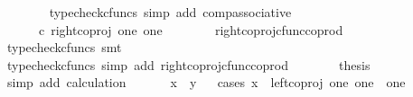 \begin{isabellebody}
\ \ \ \ \ \ \isamarkupfalse%
\ {\isacharparenleft}{\kern0pt}typecheck{\isacharunderscore}{\kern0pt}cfuncs{\isacharcomma}{\kern0pt}\ simp\ add{\isacharcolon}{\kern0pt}\ comp{\isacharunderscore}{\kern0pt}associative{}{\isacharparenright}{\kern0pt}\isanewline
\ \ \ \ \isamarkupfalse%
\ \isamarkupfalse%
\ {\isachardoublequoteopen}{\isachardot}{\kern0pt}{\isachardot}{\kern0pt}{\isachardot}{\kern0pt}\ {\isacharequal}{\kern0pt}\ {\isasymlangle}{\isasymt}{\isacharcomma}{\kern0pt}{\isasymf}{\isasymrangle}\ {\isasymamalg}\ {\isasymlangle}{\isasymf}{\isacharcomma}{\kern0pt}{\isasymt}{\isasymrangle}\ {\isasymcirc}\isactrlsub c\ right{\isacharunderscore}{\kern0pt}coproj\ one\ one{\isachardoublequoteclose}\isanewline
\ \ \ \ \ \ \isamarkupfalse%
\ right{\isacharunderscore}{\kern0pt}coproj{\isacharunderscore}{\kern0pt}cfunc{\isacharunderscore}{\kern0pt}coprod\ \isamarkupfalse%
\ {\isacharparenleft}{\kern0pt}typecheck{\isacharunderscore}{\kern0pt}cfuncs{\isacharcomma}{\kern0pt}\ smt{\isacharparenright}{\kern0pt}\isanewline
\ \ \ \ \isamarkupfalse%
\ \isamarkupfalse%
\ {\isachardoublequoteopen}{\isachardot}{\kern0pt}{\isachardot}{\kern0pt}{\isachardot}{\kern0pt}\ {\isacharequal}{\kern0pt}\ {\isasymlangle}{\isasymf}{\isacharcomma}{\kern0pt}{\isasymt}{\isasymrangle}{\isachardoublequoteclose}\isanewline
\ \ \ \ \ \ \isamarkupfalse%
\ {\isacharparenleft}{\kern0pt}typecheck{\isacharunderscore}{\kern0pt}cfuncs{\isacharcomma}{\kern0pt}\ simp\ add{\isacharcolon}{\kern0pt}\ right{\isacharunderscore}{\kern0pt}coproj{\isacharunderscore}{\kern0pt}cfunc{\isacharunderscore}{\kern0pt}coprod{\isacharparenright}{\kern0pt}\isanewline
\ \ \ \ \isamarkupfalse%
\ \isamarkupfalse%
\ {\isacharquery}{\kern0pt}thesis\isanewline
\ \ \ \ \ \ \isamarkupfalse%
\ {\isacharparenleft}{\kern0pt}simp\ add{\isacharcolon}{\kern0pt}\ calculation{\isacharparenright}{\kern0pt}\isanewline
\ \ \isamarkupfalse%
\isanewline
\ \ \isamarkupfalse%
\ {\isachardoublequoteopen}x\ {\isacharequal}{\kern0pt}\ y{\isachardoublequoteclose}\isanewline
\ \ \isamarkupfalse%
{\isacharparenleft}{\kern0pt}cases\ {\isachardoublequoteopen}x\ {\isacharequal}{\kern0pt}\ left{\isacharunderscore}{\kern0pt}coproj\ one\ {\isacharparenleft}{\kern0pt}one\ {\isasymCoprod}\ one{\isacharparenright}{\kern0pt}{\isachardoublequoteclose}{\isacharparenright}{\kern0pt}\isanewline
\ \ \ \ \isamarkupfalse%

\end{isabellebody}
